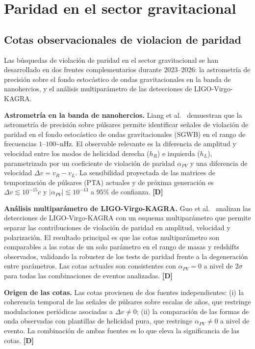 ﻿\documentclass[11pt,letterpaper]{article}
\begin{document}
\section{Paridad en el sector gravitacional}
\subsection{Cotas observacionales de violacion de paridad}
Las búsquedas de violación de paridad en el sector gravitacional se han desarrollado en dos frentes complementarios durante 2023--2026: la astrometría de precisión sobre el fondo estocástico de ondas gravitacionales en la banda de nanohercios, y el análisis multiparámetro de las detecciones de LIGO-Virgo-KAGRA.

\textbf{Astrometría en la banda de nanohercios.} Liang et al.\ \cite{Liang2023} demuestran que la astrometría de precisión sobre púlsares permite identificar señales de violación de paridad en el fondo estocástico de ondas gravitacionales (SGWB) en el rango de frecuencias $1$--$100$\textasciitilde{}nHz. El observable relevante es la diferencia de amplitud y velocidad entre los modos de helicidad derecha ($h_R$) e izquierda ($h_L$), parametrizada por un coeficiente de violación de paridad $\alpha_{PV}$ y una diferencia de velocidad $\Delta v = v_R - v_L$. La sensibilidad proyectada de las matrices de temporización de púlsares (PTA) actuales y de próxima generación es $\Delta v \lesssim 10^{-15}c$ y $|\alpha_{PV}| \lesssim 10^{-13}$ a $95\%$ de confianza. \textbf{[D]}

\textbf{Análisis multiparámetro de LIGO-Virgo-KAGRA.} Guo et al.\ \cite{Guo2026} analizan las detecciones de LIGO-Virgo-KAGRA con un esquema multiparámetro que permite separar las contribuciones de violación de paridad en amplitud, velocidad y polarización. El resultado principal es que las cotas multiparámetro son comparables a las cotas de un solo parámetro en el rango de masas y redshifts observados, validando la robustez de los tests de paridad frente a la degeneración entre parámetros. Las cotas actuales son consistentes con $\alpha_{PV} = 0$ a nivel de $2\sigma$ para todas las combinaciones de eventos analizadas. \textbf{[D]}

\textbf{Origen de las cotas.} Las cotas provienen de dos fuentes independientes: (i) la coherencia temporal de las señales de púlsares sobre escalas de años, que restringe modulaciones periódicas asociadas a $\Delta v \neq 0$; (ii) la comparación de las formas de onda observadas con plantillas de helicidad pura, que restringe $\alpha_{PV} \neq 0$ a nivel de evento. La combinación de ambas fuentes es lo que eleva la significancia de las cotas. \textbf{[D]}
\end{document}

